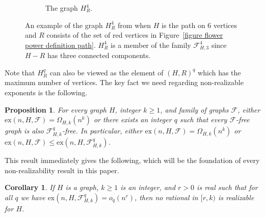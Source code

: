\documentclass[12pt,letterpaper]{article}
\newtheorem{corollary}[theorem]{Corollary}
\newtheorem{proposition}[theorem]{Proposition}
\theoremstyle{definition}
\newcommand{\pow}{q} %
\newcommand{\re}{r} %
\newcommand{\ex}{\mathrm{ex}}
\renewcommand{\c}[1]{\mathcal{#1}}
\newcommand{\Om}{\Omega}
\begin{document}
\begin{figure}[hb!]
\begin{center}
\begin{subfigure}[t]{0.4\textwidth}
\begin{center}
				\end{center}
				\caption{The graph $H_R^4$.}\label{figure flower power definition H_R^4}
			\end{subfigure}
		\end{center}
		\caption{An example of the graph $H_R^4$ from  when $H$ is the path on $6$ vertices and $R$ consists of the set of red vertices in Figure~\ref{figure flower power definition path}. $H_R^4$ is a member of the family $\mathcal{F}_{H,3}^4$ since $H-R$ has three connected components.}\label{figure flower power definition full figure}
	\end{figure}
	
	
	Note that $H_R^\pow$ can also be viewed as the element of $(H,R)^\pow$ which has the maximum number of vertices.  The key fact we need regarding non-realizable exponents is the following.
	\begin{proposition}\label{proposition:keyObservation}
		For every graph $H$, integer $k\ge 1$, and family of graphs $\c{F}$, either $\ex(n,H,\c{F})=\Om_{H,k}(n^k)$ or there exists an integer $q$ such that every $\c{F}$-free graph is also $\c{F}_{H,k}^q$-free.  In particular, either $\ex(n,H,\c{F})=\Om_{H,k}(n^k)$ or $\ex(n,H,\c{F}) \leq \ex(n,H,\c{F}_{H,k}^\pow)$.
	\end{proposition}
	
	This result immediately gives the following, which will be the foundation of every non-realizability result in this paper.
	\begin{corollary}\label{corollary:keyObservation}
		If $H$ is a graph, $k\ge 1$ is an integer, and $\re>0$ is real such that for all $\pow$ we have $\ex(n,H,\c{F}_{H,k}^\pow)=o_\pow(n^{\re})$, then no rational in $[\re,k)$ is realizable for $H$.
	\end{corollary}
	
\end{document}

